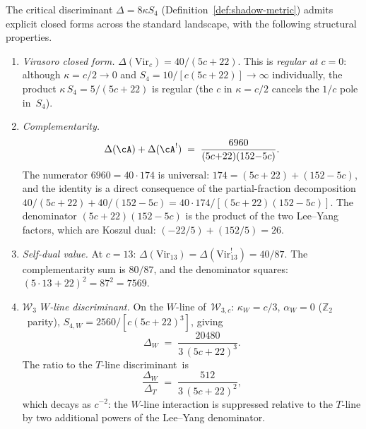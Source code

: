 \begin{corollary}
\label{cor:discriminant-atlas}
\ClaimStatusProvedHere
{}
The critical discriminant
$\Delta = 8\kappa S_4$
\textup{(}Definition~\textup{\ref{def:shadow-metric})}
admits explicit closed forms across the standard landscape,
with the following structural properties.
\begin{enumerate}[label=\textup{(\roman*)}]
\item \emph{Virasoro closed form.}\enspace
  $\Delta(\mathrm{Vir}_c) = 40/(5c{+}22)$.
  This is \emph{regular at $c = 0$}:
  although $\kappa = c/2 \to 0$ and
  $S_4 = 10/[c(5c{+}22)] \to \infty$
  individually, the product
  $\kappa\,S_4 = 5/(5c{+}22)$ is regular
  \textup{(}the $c$ in $\kappa = c/2$
  cancels the $1/c$ pole in~$S_4$\textup{)}.

\item \emph{Complementarity.}\enspace
  \begin{equation}\label{eq:discriminant-complementarity-cor}
    \Delta(\cA) + \Delta(\cA^!)
    \;=\;
    \frac{6960}{(5c{+}22)(152{-}5c)}.
  \end{equation}
  The numerator $6960 = 40 \cdot 174$
  is universal: $174 = (5c{+}22) + (152{-}5c)$,
  and the identity is a direct consequence of the
  partial-fraction decomposition
  $40/(5c{+}22) + 40/(152{-}5c)
  = 40\cdot174/[(5c{+}22)(152{-}5c)]$.
  The denominator $(5c{+}22)(152{-}5c)$ is the product of
  the two Lee--Yang factors, which are Koszul dual:
  $(-22/5) + (152/5) = 26$.

\item \emph{Self-dual value.}\enspace
  At $c = 13$: $\Delta(\mathrm{Vir}_{13})
  = \Delta(\mathrm{Vir}_{13}^!) = 40/87$.
  The complementarity sum is $80/87$,
  and the denominator squares: $(5 \cdot 13 + 22)^2 = 87^2 = 7569$.

\item \emph{$\mathcal{W}_3$ $W$-line discriminant.}\enspace
  On the $W$-line of~$\mathcal{W}_{3,c}$:
  $\kappa_W = c/3$, $\alpha_W = 0$
  \textup{(}$\mathbb{Z}_2$~parity\textup{)},
  $S_{4,W} = 2560/[c(5c{+}22)^3]$, giving
  \begin{equation}\label{eq:w3-wline-discriminant}
    \Delta_W
    \;=\; \frac{20480}{3\,(5c{+}22)^3}.
  \end{equation}
  The ratio to the $T$-line discriminant~is
  \begin{equation}\label{eq:w3-discriminant-ratio}
    \frac{\Delta_W}{\Delta_T}
    \;=\;
    \frac{512}{3\,(5c{+}22)^2},
  \end{equation}
  which decays as $c^{-2}$:
  the $W$-line interaction is suppressed relative to
  the $T$-line by two additional powers of the
  Lee--Yang denominator.


\end{enumerate}
\end{corollary}
